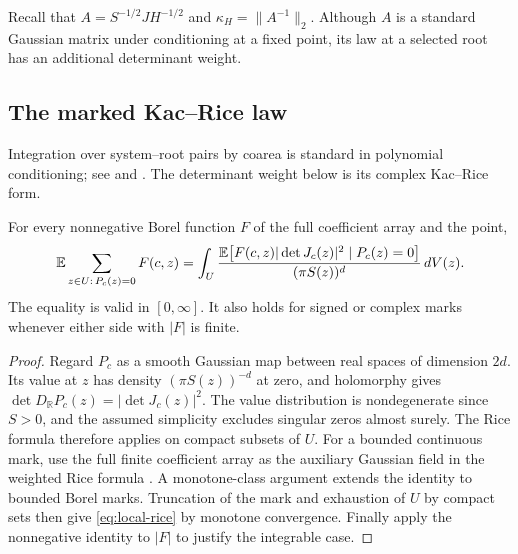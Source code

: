 Recall that $A=S^{-1/2}JH^{-1/2}$ and $\kappa_H=\|A^{-1}\|_2$.
Although $A$ is a standard Gaussian matrix under conditioning at a fixed point,
its law at a selected root has an additional determinant weight.

\subsection{The marked Kac--Rice law}

Integration over system--root pairs by coarea is standard in polynomial
conditioning; see \cite[Sections~5--6]{beltran2011fast} and
\cite[Remark~5]{armentano2016condition}. The determinant weight below is its
complex Kac--Rice form.

\begin{lemma}\label{lem:local-rice}
  For every nonnegative Borel function $F$ of the full coefficient array and
  the point,
  \begin{equation}\label{eq:local-rice}
    \mathbb E\sum_{z\in U:\,P_c(z)=0}F(c,z)
    =\int_U\frac{
       \mathbb E\bigl[F(c,z)|\det J_c(z)|^2\mid P_c(z)=0\bigr]
      }{(\pi S(z))^d}\,dV(z).
  \end{equation}
  The equality is valid in $[0,\infty]$.  It also holds for signed or complex
  marks whenever either side with $|F|$ is finite.
\end{lemma}

\begin{proof}
  Regard $P_c$ as a smooth Gaussian map between real spaces of dimension $2d$.
  Its value at $z$ has density $(\pi S(z))^{-d}$ at zero, and holomorphy gives
  $\det D_{\mathbb R}P_c(z)=|\det J_c(z)|^2$.  The value distribution is
  nondegenerate since $S>0$, and the assumed simplicity excludes singular
  zeros almost surely.  The Rice formula therefore applies on compact
  subsets of $U$.  For a bounded continuous mark, use the full finite
  coefficient array as the auxiliary Gaussian field in the weighted Rice
  formula \cite[Theorems~6.2 and~6.4]{azais2009level}.
  A monotone-class argument extends the identity to bounded Borel marks.
  Truncation of the mark and exhaustion of $U$ by compact sets then give
  \eqref{eq:local-rice} by monotone convergence.  Finally apply the
  nonnegative identity to $|F|$ to justify the integrable case.
\end{proof}

